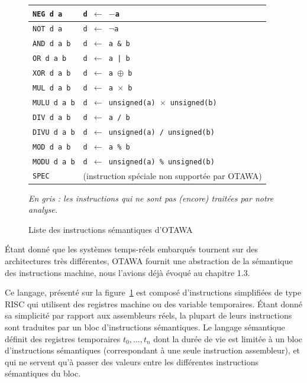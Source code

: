 \documentclass[french]{article}
\begin{document}
\begin{figure}
\begin{tabular}{|l|l|}
      \texttt{NEG d a} & \texttt{d $\leftarrow$ $-$a}\\ \hline
      \rowcolor{Gray} \texttt{NOT d a} & \texttt{d $\leftarrow$ $\neg$a}\\ \hline
      \rowcolor{Gray} \texttt{AND d a b} & \texttt{d $\leftarrow$ a \& b}\\ \hline
      \rowcolor{Gray} \texttt{OR d a b} & \texttt{d $\leftarrow$ a | b}\\ \hline
      \rowcolor{Gray} \texttt{XOR d a b} & \texttt{d $\leftarrow$ a $\oplus$ b}\\ \hline
      \texttt{MUL d a b} & \texttt{d $\leftarrow$ a $\times$ b}\\ \hline
      \rowcolor{Gray} \texttt{MULU d a b} & \texttt{d $\leftarrow$ unsigned(a) $\times$ unsigned(b)}\\ \hline
      \texttt{DIV d a b} & \texttt{d $\leftarrow$ a / b}\\ \hline
      \rowcolor{Gray} \texttt{DIVU d a b} & \texttt{d $\leftarrow$ unsigned(a) / unsigned(b)}\\ \hline
      \texttt{MOD d a b} & \texttt{d $\leftarrow$ a \% b}\\ \hline
      \rowcolor{Gray} \texttt{MODU d a b} & \texttt{d $\leftarrow$ unsigned(a) \% unsigned(b)}\\ \hline
      \rowcolor{Gray} \texttt{SPEC} & (instruction spéciale non supportée par OTAWA)\\ \hline
    \end{tabular}
    \textit{En gris : les instructions qui ne sont pas (encore) traitées par notre analyse.}
    \label{seminsts}
    \caption{Liste des instructions sémantiques d'OTAWA}
  \end{figure}
  
  \'Etant donné que les systèmes temps-réels embarqués tournent sur des architectures très différentes, OTAWA fournit une abstraction de la sémantique des instructions machine, nous l'avions déjà évoqué au chapitre 1.3. %
  
  Ce langage, présenté sur la figure~\ref{seminsts} est composé d'instructions simplifiées de type RISC qui utilisent des registres machine ou des variable temporaires. \'Etant donné sa simplicité par rapport aux assembleurs réels, la plupart de leurs instructions sont traduites par un bloc d'instructions sémantiques. Le langage sémantique définit des registres temporaires $t_0, ..., t_n$ dont la durée de vie est limitée à un bloc d'instructions sémantiques (correspondant à une seule instruction assembleur), et qui ne servent qu'à passer des valeurs entre les différentes instructions sémantiques du bloc.
  
\end{document}
